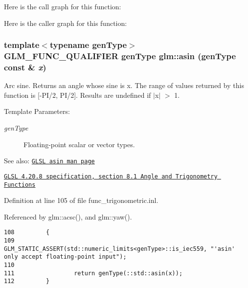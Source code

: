 Here is the call graph for this function:

Here is the caller graph for this function:\hypertarget{group__core__func__trigonometric_gb87756fced3e8d3f58b24b65c8166b77}{
\subsubsection[asin]{\setlength{\rightskip}{0pt plus 5cm}template$<$typename genType$>$ GLM\_\-FUNC\_\-QUALIFIER genType glm::asin (genType const \& {\em x})}}
\label{group__core__func__trigonometric_gb87756fced3e8d3f58b24b65c8166b77}


Arc sine. Returns an angle whose sine is x. The range of values returned by this function is \mbox{[}-PI/2, PI/2\mbox{]}. Results are undefined if $|$x$|$ $>$ 1.

\begin{Desc}
\item[Template Parameters:]
\begin{description}
\item[{\em genType}]Floating-point scalar or vector types.\end{description}
\end{Desc}
\begin{Desc}
\item[See also:]\href{http://www.opengl.org/sdk/docs/manglsl/xhtml/asin.xml}{\tt GLSL asin man page} 

\href{http://www.opengl.org/registry/doc/GLSLangSpec.4.20.8.pdf}{\tt GLSL 4.20.8 specification, section 8.1 Angle and Trigonometry Functions} \end{Desc}


Definition at line 105 of file func\_\-trigonometric.inl.

Referenced by glm::acsc(), and glm::yaw().

\begin{Code}\begin{verbatim}108         {
109                 GLM_STATIC_ASSERT(std::numeric_limits<genType>::is_iec559, "'asin' only accept floating-point input");
110 
111                 return genType(::std::asin(x));
112         }
\end{verbatim}
\end{Code}




